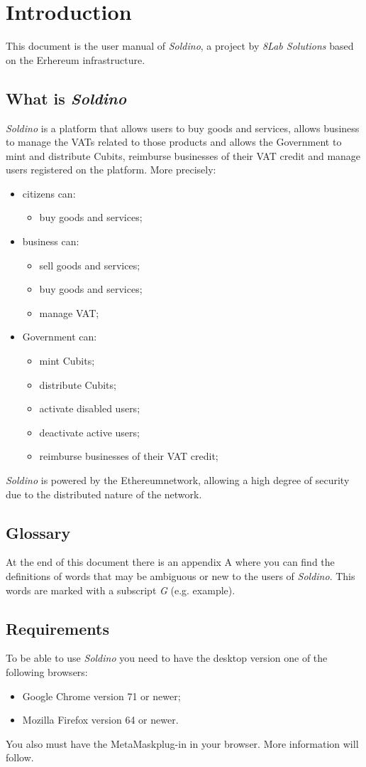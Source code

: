 \section{Introduction} 
This document is the user manual of \textit{Soldino}, a project by 
	\textit{8Lab Solutions} based on the Erhereum infrastructure. 
	\subsection{What is \textit{Soldino}}
	\textit{Soldino} is a platform that allows 
	users to buy goods and services, allows business to manage the VATs 
	related to those products and allows the Government to mint and distribute
	Cubits\glo, reimburse businesses of their VAT credit and manage users 
	registered on the platform.
	More precisely:
	\begin{itemize}
		\item citizens can:
		\begin{itemize}
			\item  buy goods and services;
		\end{itemize}
		\item business can:
		\begin{itemize}
			\item sell goods and services;
			\item buy goods and services;
			\item manage VAT;
		\end{itemize}
		\item Government can:
		\begin{itemize}
			\item mint Cubits\glo;
			\item distribute Cubits\glo;
			\item activate disabled users;
			\item deactivate active users;
			\item reimburse businesses of their VAT credit;
		\end{itemize}
	\end{itemize}
	\textit{Soldino} is powered by the Ethereum\glosp network, allowing a high
	degree of security due to the distributed nature of the network.
	\subsection{Glossary}
	At the end of this document there is an appendix A where you can find 
	the definitions of words that may be ambiguous or new to the users of 
	\textit{Soldino}. This words are marked with a subscript \textit{G} 
	(e.g. example\glo).
	\subsection{Requirements}
	To be able to use \textit{Soldino} you need to have the desktop version 
	one of the following browsers:
	\begin{itemize}
		\item Google Chrome version 71 or newer;
		\item Mozilla Firefox version 64 or newer.
	\end{itemize}
	You also must have the MetaMask\glosp plug-in in your browser. More 
	information will follow. 